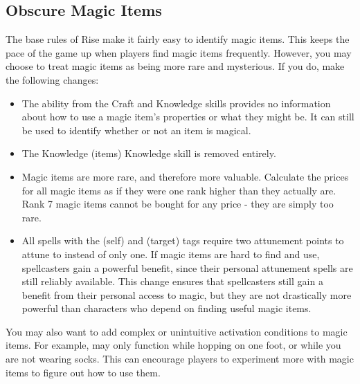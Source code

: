     \subsection{Obscure Magic Items}\label{Obscure Magic Items}
        The base rules of Rise make it fairly easy to identify magic items.
        This keeps the pace of the game up when players find magic items frequently.
        However, you may choose to treat magic items as being more rare and mysterious.
        If you do, make the following changes:
        \begin{itemize}
            \item The  ability from the Craft and Knowledge skills provides no information about how to use a magic item's properties or what they might be.
                It can still be used to identify whether or not an item is magical.
            \item The Knowledge (items) Knowledge skill is removed entirely.
            \item Magic items are more rare, and therefore more valuable.
                Calculate the prices for all magic items as if they were one rank higher than they actually are.
                Rank 7 magic items cannot be bought for any price - they are simply too rare.
            \item All spells with the  (self) and  (target) tags require two attunement points to attune to instead of only one.
                If magic items are hard to find and use, spellcasters gain a powerful benefit, since their personal attunement spells are still reliably available.
                This change ensures that spellcasters still gain a benefit from their personal access to magic, but they are not drastically more powerful than characters who depend on finding useful magic items.
        \end{itemize}

        You may also want to add complex or unintuitive activation conditions to magic items.
        For example,  may only function while hopping on one foot, or while you are not wearing socks.
        This can encourage players to experiment more with magic items to figure out how to use them.

